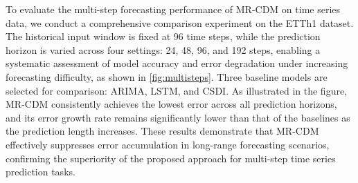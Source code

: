 To evaluate the multi-step forecasting performance of MR-CDM on time series data, we conduct a comprehensive comparison experiment on the ETTh1 dataset. The historical input window is fixed at 96 time steps, while the prediction horizon is varied across four settings: 24, 48, 96, and 192 steps, enabling a systematic assessment of model accuracy and error degradation under increasing forecasting difficulty, as shown in \autoref{fig:multisteps}. Three baseline models are selected for comparison: ARIMA, LSTM, and CSDI. As illustrated in the figure, MR-CDM consistently achieves the lowest error across all prediction horizons, and its error growth rate remains significantly lower than that of the baselines as the prediction length increases. These results demonstrate that MR-CDM effectively suppresses error accumulation in long-range forecasting scenarios, confirming the superiority of the proposed approach for multi-step time series prediction tasks.










